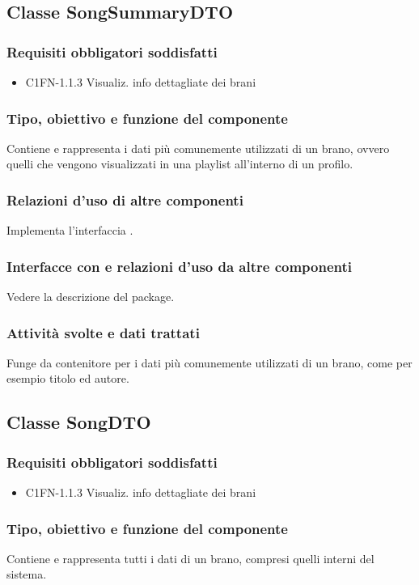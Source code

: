 \subsection{Classe SongSummaryDTO}
\subsubsection*{Requisiti obbligatori soddisfatti}
\begin{itemize}
	\item C1FN-1.1.3 Visualiz. info dettagliate dei brani
\end{itemize}
\subsubsection*{Tipo, obiettivo e funzione del componente}
Contiene e rappresenta i dati pi\`u comunemente utilizzati di un brano, ovvero
quelli che vengono visualizzati in una playlist all'interno di un profilo.
\subsubsection*{Relazioni d'uso di altre componenti}
Implementa l'interfaccia .
\subsubsection*{Interfacce con e relazioni d'uso da altre componenti}
Vedere la descrizione del package.
\subsubsection*{Attivit\`a svolte e dati trattati}
Funge da contenitore per i dati pi\`u comunemente utilizzati di un brano, come
per esempio titolo ed autore.

\subsection{Classe SongDTO}
\subsubsection*{Requisiti obbligatori soddisfatti}
\begin{itemize}
	\item C1FN-1.1.3 Visualiz. info dettagliate dei brani
\end{itemize}
\subsubsection*{Tipo, obiettivo e funzione del componente}
Contiene e rappresenta tutti i dati di un brano, compresi quelli interni del
sistema. 
